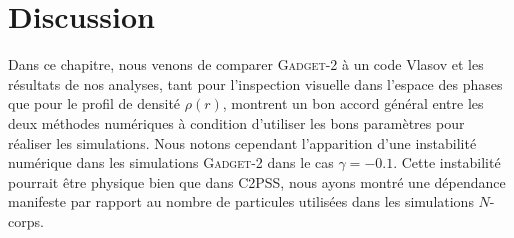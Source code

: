 


	\section{Discussion}
		\label{Sec::VlaGad::Art}


		Dans ce chapitre, nous venons de comparer \textsc{Gadget-2} à un code Vlasov et les résultats de nos analyses, tant pour l'inspection visuelle dans l'espace des phases
		que pour le profil de densité $\rho(r)$, montrent un bon accord général entre les deux méthodes numériques à condition d'utiliser les bons paramètres pour réaliser les
		simulations. Nous notons cependant l'apparition d'une instabilité numérique dans les simulations \textsc{Gadget-2} dans le cas $\gamma=-0.1$. Cette instabilité
		pourrait être
		physique bien que dans C2PSS, nous ayons montré une dépendance manifeste par rapport au nombre de particules utilisées dans les simulations $N$-corps.
		
